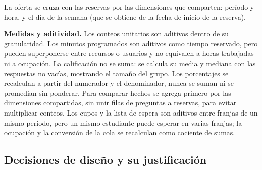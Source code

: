 \documentclass[11pt,letterpaper]{article}
\begin{document}
La oferta se cruza con las reservas por las dimensiones que comparten: período y hora, y el día de la semana (que se obtiene de la fecha de inicio de la reserva).

\textbf{Medidas y aditividad.} Los conteos unitarios son aditivos dentro de su granularidad. Los minutos programados son aditivos como tiempo reservado, pero pueden superponerse entre recursos o usuarios y no equivalen a horas trabajadas ni a ocupación. La calificación no se suma: se calcula su media y mediana con las respuestas no vacías, mostrando el tamaño del grupo. Los porcentajes se recalculan a partir del numerador y el denominador, nunca se suman ni se promedian sin ponderar. Para comparar hechos se agrega primero por las dimensiones compartidas, sin unir filas de preguntas a reservas, para evitar multiplicar conteos. Los cupos y la lista de espera son aditivos entre franjas de un mismo período, pero un mismo estudiante puede esperar en varias franjas; la ocupación y la conversión de la cola se recalculan como cociente de sumas.

\subsection{Decisiones de diseño y su justificación}
\end{document}
